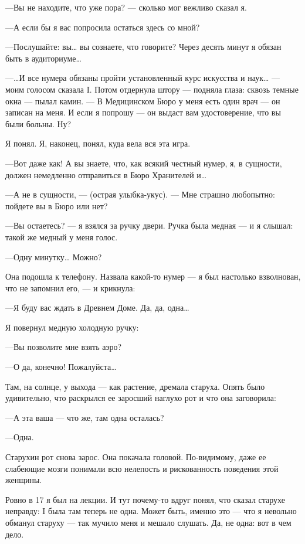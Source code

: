 \documentclass[11pt,openany]{book}
\begin{document}
---Вы не находите, что уже пора? --- сколько мог вежливо сказал я.

---А если бы я вас попросила остаться здесь со мной?

---Послушайте: вы\ldots{} вы сознаете, что говорите? Через десять минут я обязан быть в аудиториуме\ldots{}

---\ldots{}И все нумера обязаны пройти установленный курс искусства и наук\ldots{} --- моим голосом сказала I. Потом отдернула штору --- подняла глаза: сквозь темные окна --- пылал камин. --- В Медицинском Бюро у меня есть один врач --- он записан на меня. И если я попрошу --- он выдаст вам удостоверение, что вы были больны. Ну?

Я понял. Я, наконец, понял, куда вела вся эта игра.

---Вот даже как! А вы знаете, что, как всякий честный нумер, я, в сущности, должен немедленно отправиться в Бюро Хранителей и\ldots{}

---А не в сущности, --- (острая улыбка-укус). --- Мне страшно любопытно: пойдете вы в Бюро или нет?

---Вы остаетесь? --- я взялся за ручку двери. Ручка была медная --- и я слышал: такой же медный у меня голос.

---Одну минутку\ldots{} Можно?

Она подошла к телефону. Назвала какой-то нумер --- я был настолько взволнован, что не запомнил его, --- и крикнула:

---Я буду вас ждать в Древнем Доме. Да, да, одна\ldots{}

Я повернул медную холодную ручку:

---Вы позволите мне взять аэро?

---О да, конечно! Пожалуйста\ldots{}

Там, на солнце, у выхода --- как растение, дремала старуха. Опять было удивительно, что раскрылся ее заросший наглухо рот и что она заговорила:

---А эта ваша --- что же, там одна осталась?

---Одна.

Старухин рот снова зарос. Она покачала головой. По-видимому, даже ее слабеющие мозги понимали всю нелепость и рискованность поведения этой женщины.

Ровно в 17 я был на лекции. И тут почему-то вдруг понял, что сказал старухе неправду: I была там теперь не одна. Может быть, именно это --- что я невольно обманул старуху --- так мучило меня и мешало слушать. Да, не одна: вот в чем дело.
\end{document}

